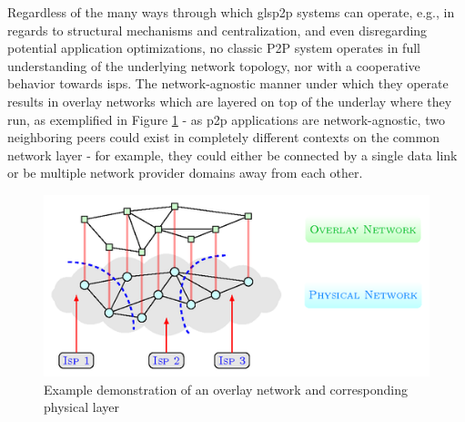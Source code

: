     Regardless of the many ways through which gls{p2p} systems can operate, e.g., in regards to structural mechanisms and centralization, and even disregarding potential application optimizations, no classic P2P system operates in full understanding of the underlying network topology, nor with a cooperative behavior towards \glspl{isp}.
    The network-agnostic manner under which they operate results in overlay networks which are layered on top of the underlay where they run, as exemplified in Figure \ref{fig:overlay-underlay} - as \gls{p2p} applications are network-agnostic, two neighboring peers could exist in completely different contexts on the common network layer - for example, they could either be connected by a single data link or be multiple network provider domains away from each other.

\begin{figure}[!h]
\centering
\includegraphics[scale=3.0]{img/p2p-topology.png}
\caption{Example demonstration of an overlay network and corresponding physical layer \cite{overlay-vs-underlay}}
\label{fig:overlay-underlay}
\end{figure}

